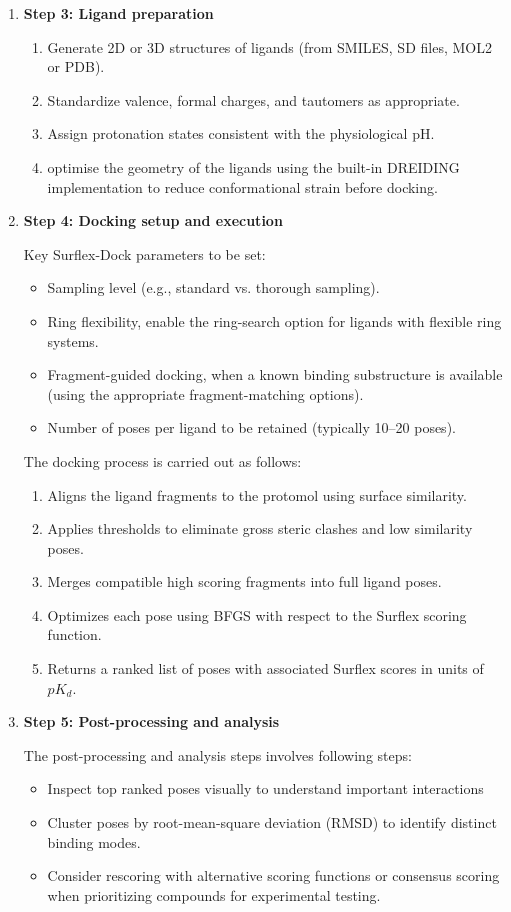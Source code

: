 \documentclass[12pt, a4paper]{article}
\begin{document}
\begin{enumerate}
\item \textbf{Step 3: Ligand preparation}

\begin{enumerate}
  \item Generate 2D or 3D structures of ligands (from SMILES, SD files, MOL2 or PDB).
  \item Standardize valence, formal charges, and tautomers as appropriate.
  \item Assign protonation states consistent with the physiological pH.
  \item optimise the geometry of the ligands using the built-in DREIDING implementation to reduce conformational strain before docking.
\end{enumerate}

\item \textbf{Step 4: Docking setup and execution}

Key Surflex-Dock parameters to be set:
\begin{itemize}
  \item Sampling level (e.g., standard vs. thorough sampling).
  \item Ring flexibility, enable the ring-search option for ligands with flexible ring systems.
  \item Fragment-guided docking, when a known binding substructure is available (using the appropriate fragment-matching options).
  \item Number of poses per ligand to be retained (typically 10--20 poses).
\end{itemize}

The docking process is carried out as follows:
\begin{enumerate}
  \item Aligns the ligand fragments to the protomol using surface similarity.
  \item Applies thresholds to eliminate gross steric clashes and low similarity poses.
  \item Merges compatible high scoring fragments into full ligand poses.
  \item Optimizes each pose using BFGS with respect to the Surflex scoring function.
  \item Returns a ranked list of poses with associated Surflex scores in units of $pK_d$.
\end{enumerate}

\item \textbf{Step 5: Post-processing and analysis}

The post-processing and analysis steps involves following steps:
\begin{itemize}
  \item Inspect top ranked poses visually to understand important interactions
  \item Cluster poses by root-mean-square deviation (RMSD) to identify distinct binding modes.
  \item Consider rescoring with alternative scoring functions or consensus scoring when prioritizing compounds for experimental testing.
\end{itemize}
\end{enumerate}
\end{document}
